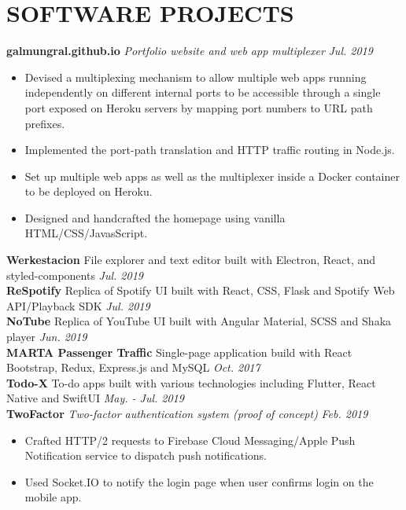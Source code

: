 \documentclass[11pt]{article}
\begin{document}
\section*{SOFTWARE PROJECTS}
\textbf{galmungral.github.io}  \enspace \textit{\color{gray} Portfolio website and web app multiplexer} \hfill\textit{Jul. 2019}
\begin{itemize}[leftmargin=15pt, noitemsep, topsep=0pt]
\item Devised a multiplexing mechanism to allow multiple web apps running independently on different internal ports to be accessible through a single port exposed on Heroku servers by mapping port numbers to URL path prefixes.
\item Implemented the port-path translation and HTTP traffic routing in Node.js.
\item Set up multiple web apps as well as the multiplexer inside a Docker container to be deployed on Heroku.
\item Designed and handcrafted the homepage using vanilla HTML/CSS/JavasScript.
\end{itemize}
\vspace{0.5em}
\textbf{Werkestacion} \enspace File explorer and text editor built with Electron, React, and styled-components \hfill \textit{Jul. 2019}\\
\textbf{ReSpotify} \enspace Replica of Spotify UI built with React, CSS, Flask and Spotify Web API/Playback SDK \hfill\textit{Jul. 2019}\\
\textbf{NoTube} \enspace Replica of YouTube UI built with Angular Material, SCSS and Shaka player \hfill\textit{Jun. 2019}\\
\textbf{MARTA Passenger Traffic} \enspace Single-page application build with React Bootstrap, Redux, Express.js and MySQL \hfill\textit{Oct. 2017}\\
\textbf{Todo-X} \enspace To-do apps built with various technologies including Flutter, React Native and SwiftUI\vspace{0.5em} \hfill\textit{May. - Jul. 2019}\\
%
\textbf{TwoFactor} \enspace \textit{\color{gray} Two-factor authentication system (proof of concept)} \hfill \textit{Feb. 2019}
\begin{itemize}[leftmargin=15pt, noitemsep, topsep=0pt]
\item Crafted HTTP/2 requests to Firebase Cloud Messaging/Apple Push Notification service to dispatch push notifications.
\item Used Socket.IO to notify the login page when user confirms login on the mobile app.
\end{itemize}
\end{document}

